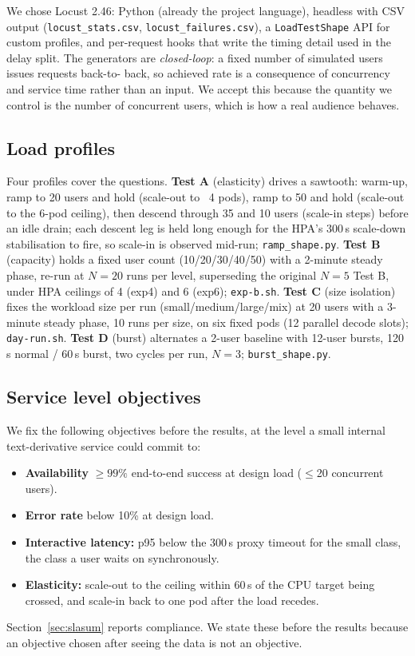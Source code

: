 \documentclass[conference]{IEEEtran}
\newcommand{\code}[1]{\texttt{#1}}
\begin{document}
We chose Locust 2.46: Python (already the project language), headless with
CSV output (\code{locust\_stats.csv}, \code{locust\_failures.csv}), a
\code{LoadTestShape} API for custom profiles, and per-request hooks that write
the timing detail used in the delay split. The generators are
\emph{closed-loop}: a fixed number of simulated users issues requests back-to-
back, so achieved rate is a consequence of concurrency and service time rather
than an input. We accept this because the quantity we control is the number of
concurrent users, which is how a real audience behaves.

\subsection{Load profiles}
\label{sec:design}

Four profiles cover the questions. \textbf{Test A} (elasticity) drives a
sawtooth: warm-up, ramp to 20 users and hold (scale-out to ~4 pods), ramp to
50 and hold (scale-out to the 6-pod ceiling), then descend through 35 and 10
users (scale-in steps) before an idle drain; each descent leg is held long
enough for the HPA's 300\,s scale-down stabilisation to fire, so scale-in is
observed mid-run; \code{ramp\_shape.py}. \textbf{Test B} (capacity) holds a
fixed user count (10/20/30/40/50) with a 2-minute steady phase, re-run at
$N{=}20$ runs per level, superseding the original $N{=}5$ Test B, under
HPA ceilings of 4 (exp4) and 6 (exp6); \code{exp-b.sh}.
\textbf{Test C} (size isolation) fixes the workload size per
run (small/medium/large/mix) at 20 users with a 3-minute steady phase, 10
runs per size, on six fixed pods (12 parallel decode slots); \code{day-run.sh}.
\textbf{Test D} (burst) alternates a 2-user baseline with 12-user bursts, 120\,s
normal / 60\,s burst, two cycles per run, $N{=}3$; \code{burst\_shape.py}.

\subsection{Service level objectives}
\label{sec:sla}

We fix the following objectives before the results, at the level a small
internal text-derivative service could commit to:
\begin{itemize}\itemsep0pt
\item \textbf{Availability} $\ge 99\%$ end-to-end success at design load
($\le$20 concurrent users).
\item \textbf{Error rate} below 10\% at design load.
\item \textbf{Interactive latency:} p95 below the 300\,s proxy timeout for the
small class, the class a user waits on synchronously.
\item \textbf{Elasticity:} scale-out to the ceiling within 60\,s of the CPU
target being crossed, and scale-in back to one pod after the load recedes.
\end{itemize}
Section~\ref{sec:slasum} reports compliance. We state these before the
results because an objective chosen after seeing the data is not an objective.
\end{document}
